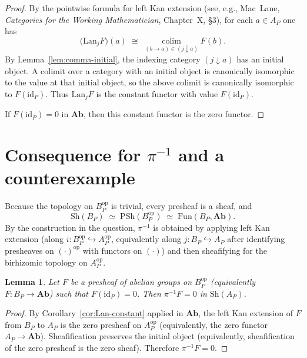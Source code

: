 \documentclass[11pt]{article}
\newtheorem{lemma}[theorem]{Lemma}
\theoremstyle{remark}
\begin{document}
\begin{proof}
By the pointwise formula for left Kan extension (see, e.g., Mac~Lane,
\emph{Categories for the Working Mathematician}, Chapter~X, \S3),
for each $a\in A_P$ one has
\[
\bigl(\mathrm{Lan}_j F\bigr)(a)\;\cong\;\operatorname*{colim}_{(b\to a)\in (j\downarrow a)} F(b).
\]
By Lemma~\ref{lem:comma-initial}, the indexing category $(j\downarrow a)$ has an initial object.
A colimit over a category with an initial object is canonically isomorphic to the value at that initial object,
so the above colimit is canonically isomorphic to $F(\mathrm{id}_P)$.
Thus $\mathrm{Lan}_j F$ is the constant functor with value $F(\mathrm{id}_P)$.

If $F(\mathrm{id}_P)=0$ in $\mathbf{Ab}$, then this constant functor is the zero functor.
\end{proof}

\section{Consequence for $\pi^{-1}$ and a counterexample}

Because the topology on $B_P^{\mathrm{op}}$ is trivial, every presheaf is a sheaf, and
\[
\mathrm{Sh}(B_P)\;\simeq\;\mathrm{PSh}(B_P^{\mathrm{op}})\;\simeq\;\mathrm{Fun}(B_P,\mathbf{Ab}).
\]
By the construction in the question, $\pi^{-1}$ is obtained by applying left Kan extension
(along $i\colon B_P^{\mathrm{op}}\hookrightarrow A_P^{\mathrm{op}}$, equivalently along $j\colon B_P\hookrightarrow A_P$
after identifying presheaves on $(\cdot)^{\mathrm{op}}$ with functors on $(\cdot)$) and then sheafifying
for the birhizomic topology on $A_P^{\mathrm{op}}$.

\begin{lemma}\label{lem:pi-inv-zero}
Let $F$ be a presheaf of abelian groups on $B_P^{\mathrm{op}}$ (equivalently $F\colon B_P\to \mathbf{Ab}$)
such that $F(\mathrm{id}_P)=0$. Then $\pi^{-1}F = 0$ in $\mathrm{Sh}(A_P)$.
\end{lemma}

\begin{proof}
By Corollary~\ref{cor:Lan-constant} applied in $\mathbf{Ab}$, the left Kan extension of $F$ from $B_P$ to $A_P$
is the zero presheaf on $A_P^{\mathrm{op}}$ (equivalently, the zero functor $A_P\to\mathbf{Ab}$).
Sheafification preserves the initial object (equivalently, sheafification of the zero presheaf is the zero sheaf).
Therefore $\pi^{-1}F=0$.
\end{proof}
\end{document}
